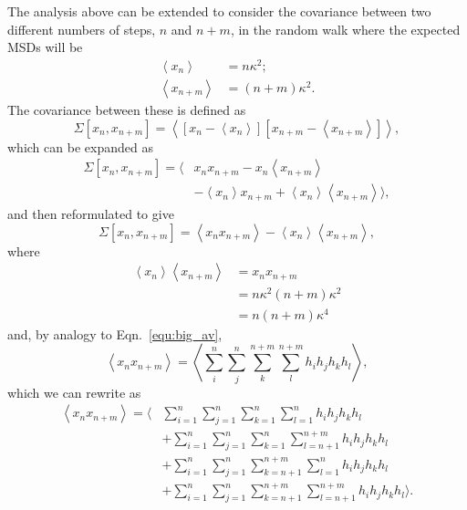 \documentclass[reprint,superscriptaddress,nobibnotes,amsmath,amssymb,aps,prx,hidelinks,linenumbers]{revtex4-2}
\newcommand{\oMSDn}{\ensuremath{x_n}}
\newcommand{\oMSDm}{\ensuremath{x_{n + m}}}
\newcommand{\moMSDn}{\ensuremath{\left<\oMSDn\right>}}
\newcommand{\moMSDm}{\ensuremath{\left<\oMSDm\right>}}
\begin{document}
The analysis above can be extended to consider the covariance between two different numbers of steps, $n$ and $n+m$, in the random walk where the expected MSDs will be
\begin{equation}
    \begin{aligned}
        \moMSDn &= n\kappa^2; \\
        \moMSDm &= (n+m)\kappa^2.
    \end{aligned}
\end{equation}
The covariance between these is defined as
\begin{equation}
    \Sigma \left[\oMSDn, \oMSDm \right] = \left<{\left[{\oMSDn - \moMSDn}\right] \left[{\oMSDm - \moMSDm}\right]}\right>, 
\end{equation}
which can be expanded as
\begin{equation}
    \begin{aligned}
        \Sigma \left[\oMSDn, \oMSDm \right] = \big\langle & \oMSDn\oMSDm - \oMSDn\moMSDm \\
        & - \moMSDn\oMSDm + \moMSDn\moMSDm\big\rangle,
    \end{aligned}
\end{equation}
and then reformulated to give
\begin{equation}
    \Sigma \left[\oMSDn, \oMSDm \right] = \left<\oMSDn\oMSDm\right> - \moMSDn\moMSDm,
    \label{equ:pair}
\end{equation}
where 
\begin{equation}
    \begin{aligned}
        \moMSDn\moMSDm &= \oMSDn\oMSDm \\
                       &= n\kappa^2(n+m)\kappa^2 \\
                       &= n(n+m)\kappa^4
    \end{aligned}
\end{equation}
and, by analogy to Eqn.~\ref{equ:big_av},
\begin{equation}
    \left<\oMSDn\oMSDm\right> = \left<\sum_i^n\sum_j^n\sum_k^{n+m}\sum_l^{n+m} h_i h_j h_k h_l\right>,
\end{equation}
which we can rewrite as
\begin{equation}
    \begin{aligned}
        \left<\oMSDn\oMSDm\right> = \Bigg\langle & \sum_{i=1}^n\sum_{j=1}^n\sum_{k=1}^{n}\sum_{l=1}^{n} h_i h_j h_k h_l \\
        & + \sum_{i=1}^n\sum_{j=1}^n\sum_{k=1}^{n}\sum_{l=n+1}^{n+m} h_i h_j h_k h_l \\
        & + \sum_{i=1}^n\sum_{j=1}^n\sum_{k=n+1}^{n+m}\sum_{l=1}^{n} h_i h_j h_k h_l \\
        & + \sum_{i=1}^n\sum_{j=1}^n\sum_{k=n+1}^{n+m}\sum_{l=n+1}^{n+m} h_i h_j h_k h_l \Bigg\rangle.
    \end{aligned}
    \label{equ:vbig}
\end{equation}
\end{document}
